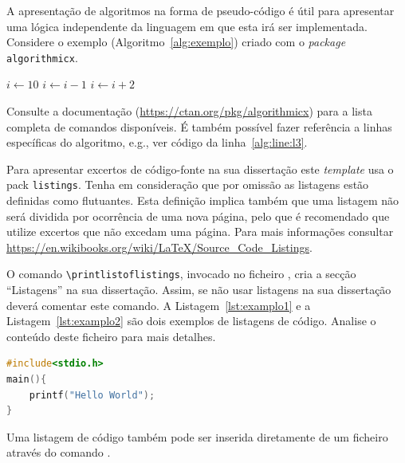 A apresentação de algoritmos na forma de pseudo-código é útil para apresentar uma lógica independente da linguagem em que esta irá ser implementada. Considere o exemplo (Algoritmo~\ref{alg:exemplo}) criado com o \textit{package} \verb|algorithmicx|. 

\begin{algorithm}[hbt!]
\caption{Exemplo de um algoritmo}
\label{alg:exemplo}
\hrulefill
\begin{algorithmic}[1]
\State $i \gets 10$
    \State $i \gets i-1$ 	\label{alg:line:l3}
\Else
        \State $i \gets i+2$ 
    \EndIf
\EndIf 
\end{algorithmic}
\hrulefill
\end{algorithm}

Consulte a documentação (\url{https://ctan.org/pkg/algorithmicx}) para a lista completa de comandos disponíveis. É também possível fazer referência a linhas específicas do algoritmo, e.g., ver código da linha~\ref{alg:line:l3}.

Para apresentar excertos de código-fonte na sua dissertação este \textit{template} usa o \gls{pack} \verb|listings|. Tenha em consideração que por omissão as listagens estão definidas como flutuantes. Esta definição implica também que uma listagem não será dividida por ocorrência de uma nova página, pelo que é recomendado que utilize excertos que não excedam uma página. Para mais informações consultar \url{https://en.wikibooks.org/wiki/LaTeX/Source_Code_Listings}.

O comando \verb|\printlistoflistings|, invocado no ficheiro , cria a secção ``Listagens'' na sua dissertação. Assim, se não usar listagens na sua dissertação deverá comentar este comando. A Listagem~\ref{lst:examplo1} e a Listagem~\ref{lst:examplo2} são dois exemplos de listagens de código. Analise o conteúdo deste ficheiro para mais detalhes.

\begin{center}
\begin{minipage}{0.7\linewidth}
\begin{lstlisting}[language=C, caption=Exemplo simples de C., label=lst:examplo1]
#include<stdio.h>
main(){
	printf("Hello World");
}
\end{lstlisting}
\end{minipage}
\end{center}

Uma listagem de código também pode ser inserida diretamente de um ficheiro através do comando \verb||.

